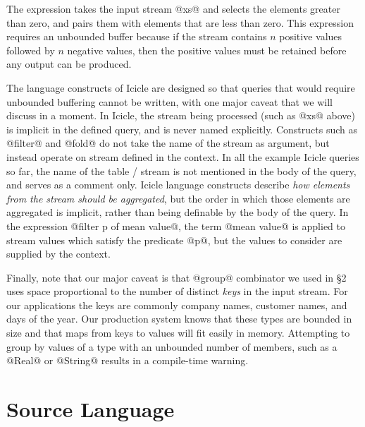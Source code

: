 The expression takes the input stream @xs@ and selects the elements greater than zero, and pairs them with elements that are less than zero. This expression requires an unbounded buffer because if the stream contains $n$ positive values followed by $n$ negative values, then the positive values must be retained before any output can be produced. 

The language constructs of Icicle are designed so that queries that would require unbounded buffering cannot be written, with one major caveat that we will discuss in a moment. In Icicle, the stream being processed (such as @xs@ above) is implicit in the defined query, and is never named explicitly. Constructs such as @filter@ and @fold@ do not take the name of the stream as argument, but instead operate on stream defined in the context. In all the example Icicle queries so far, the name of the table / stream is not mentioned in the body of the query, and serves as a comment only. Icicle language constructs describe \emph{how elements from the stream should be aggregated}, but the order in which those elements are aggregated is implicit, rather than being definable by the body of the query. In the expression @filter p of mean value@, the term @mean value@ is applied to stream values which satisfy the predicate @p@, but the values to consider are supplied by the context.

Finally, note that our major caveat is that @group@ combinator we used in \S2 uses space proportional to the number of distinct \emph{keys} in the input stream. For our applications the keys are commonly company names, customer names, and days of the year. Our production system knows that these types are bounded in size and that maps from keys to values will fit easily in memory. Attempting to group by values of a type with an unbounded number of members, such as a @Real@ or @String@ results in a compile-time warning.






\eject
\section{Source Language}
\label{s:IcicleSource}

